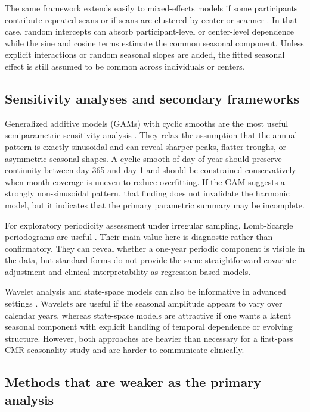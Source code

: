 The same framework extends easily to mixed-effects models if some participants contribute repeated scans or if scans are clustered by center or scanner \cite{Pinheiro2000}. In that case, random intercepts can absorb participant-level or center-level dependence while the sine and cosine terms estimate the common seasonal component. Unless explicit interactions or random seasonal slopes are added, the fitted seasonal effect is still assumed to be common across individuals or centers.

\subsection*{Sensitivity analyses and secondary frameworks}

Generalized additive models (GAMs) with cyclic smooths are the most useful semiparametric sensitivity analysis \cite{Wood2017}. They relax the assumption that the annual pattern is exactly sinusoidal and can reveal sharper peaks, flatter troughs, or asymmetric seasonal shapes. A cyclic smooth of day-of-year should preserve continuity between day 365 and day 1 and should be constrained conservatively when month coverage is uneven to reduce overfitting. If the GAM suggests a strongly non-sinusoidal pattern, that finding does not invalidate the harmonic model, but it indicates that the primary parametric summary may be incomplete.

For exploratory periodicity assessment under irregular sampling, Lomb-Scargle periodograms are useful \cite{Lomb1976,Scargle1982,VanderPlas2018}. Their main value here is diagnostic rather than confirmatory. They can reveal whether a one-year periodic component is visible in the data, but standard forms do not provide the same straightforward covariate adjustment and clinical interpretability as regression-based models.

Wavelet analysis and state-space models can also be informative in advanced settings \cite{Torrence1998,Harvey1989}. Wavelets are useful if the seasonal amplitude appears to vary over calendar years, whereas state-space models are attractive if one wants a latent seasonal component with explicit handling of temporal dependence or evolving structure. However, both approaches are heavier than necessary for a first-pass CMR seasonality study and are harder to communicate clinically.

\subsection*{Methods that are weaker as the primary analysis}

